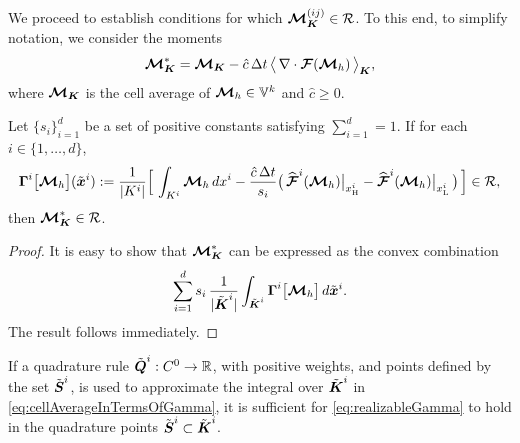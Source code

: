 We proceed to establish conditions for which $\boldsymbol{\mathcal{M}}_{\boldsymbol{K}}^{(ij)}\in\mathcal{R}$.  
To this end, to simplify notation, we consider the moments
\begin{equation}
  \boldsymbol{\mathcal{M}}_{\boldsymbol{K}}^{*}
  =\boldsymbol{\mathcal{M}}_{\boldsymbol{K}}-\hat{c}\,\Delta t\,\big\langle\,\nabla\cdot\boldsymbol{\mathcal{F}}(\boldsymbol{\mathcal{M}}_{h})\,\big\rangle_{\boldsymbol{K}},
\end{equation}
where $\boldsymbol{\mathcal{M}}_{\boldsymbol{K}}$ is the cell average of $\boldsymbol{\mathcal{M}}_{h}\in\mathbb{V}^{k}$ and $\hat{c}\ge0$.  
\begin{lemma}
  Let $\{s_{i}\}_{i=1}^{d}$ be a set of positive constants satisfying $\sum_{i=1}^{d}=1$.  
  If for each $i\in\{1,\ldots,d\}$, 
  \begin{equation}
    \boldsymbol{\Gamma}^{i}\big[\boldsymbol{\mathcal{M}}_{h}\big](\tilde{\boldsymbol{x}}^{i})
    :=\frac{1}{|K^{i}|}
    \Big[\,\int_{K^{i}}\boldsymbol{\mathcal{M}}_{h}\,dx^{i}-\frac{\hat{c}\,\Delta t}{s_{i}}\big(\,\widehat{\boldsymbol{\mathcal{F}}}^{i}(\boldsymbol{\mathcal{M}}_{h})\big|_{x_{\mbox{\tiny H}}^{i}}-\widehat{\boldsymbol{\mathcal{F}}}^{i}(\boldsymbol{\mathcal{M}}_{h})\big|_{x_{\mbox{\tiny L}}^{i}}\,\big)\,\Big]\in\mathcal{R},
    \label{eq:realizableGamma}
  \end{equation}
  then $\boldsymbol{\mathcal{M}}_{\boldsymbol{K}}^{*}\in\mathcal{R}$.  
\end{lemma}
\begin{proof}
  It is easy to show that $\boldsymbol{\mathcal{M}}_{\boldsymbol{K}}^{*}$ can be expressed as the convex combination
  \begin{equation}
    \sum_{i=1}^{d}s_{i}\,\frac{1}{|\tilde{\boldsymbol{\boldsymbol{K}}}^{i}|}\int_{\tilde{\boldsymbol{K}}^{i}}\boldsymbol{\Gamma}^{i}\big[\boldsymbol{\mathcal{M}}_{h}\big]\,d\tilde{\boldsymbol{x}}^{i}.  
    \label{eq:cellAverageInTermsOfGamma}
  \end{equation}
  The result follows immediately.  
\end{proof}
\begin{rem}
  If a quadrature rule $\tilde{\boldsymbol{Q}}^{i}:C^{0}\to\mathbb{R}$, with positive weights, and points defined by the set $\tilde{\boldsymbol{S}}^{i}$, is used to approximate the integral over $\tilde{\boldsymbol{K}}^{i}$ in \eqref{eq:cellAverageInTermsOfGamma}, it is sufficient for \eqref{eq:realizableGamma} to hold in the quadrature points $\tilde{\boldsymbol{S}}^{i}\subset\tilde{\boldsymbol{K}}^{i}$.  
\end{rem}

